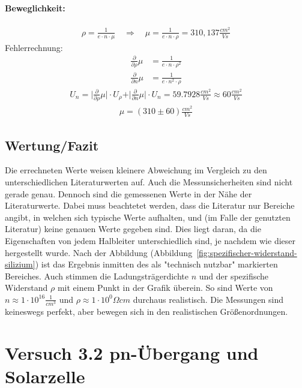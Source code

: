 \documentclass[a4paper]{scrartcl}
\numberwithin{equation}{subsection}
\begin{document}
\paragraph{Beweglichkeit:\\}
\begin{align}
\rho = \frac{1}{e \cdot n \cdot \mu} \quad \Rightarrow \quad \mu = \frac{1}{e \cdot n \cdot \rho} = 310,137 \frac{cm^2}{Vs}
\end{align}
Fehlerrechnung:
\begin{align*}
\frac{\partial}{\partial \rho} \mu &= \frac{1}{e \cdot n \cdot \rho^2} \\
\frac{\partial}{\partial n} \mu &= \frac{1}{e \cdot n^2 \cdot \rho} 
\end{align*}
\begin{align*}
U_{n} = \vert \frac{\partial}{\partial \rho} \mu \vert \cdot U_{\rho} + 
		\vert \frac{\partial}{\partial n} \mu \vert \cdot U_{n} = 59.7928 \frac{cm^2}{Vs} \approx 60 \frac{cm^2}{Vs}
\end{align*}
\begin{align*}
\mu = (310 \pm 60)\frac{cm^2}{Vs}
\end{align*}

\newpage

\subsection{Wertung/Fazit}
Die errechneten Werte weisen kleinere Abweichung im Vergleich zu den unterschiedlichen Literaturwerten auf. Auch die Messunsicherheiten sind nicht gerade genau. Dennoch sind die gemessenen Werte in der Nähe der Literaturwerte. Dabei muss beachtetet werden, dass die Literatur nur Bereiche angibt, in welchen sich typische Werte aufhalten, und (im Falle der genutzten Literatur) keine genauen Werte gegeben sind. Dies liegt daran, da die Eigenschaften von jedem Halbleiter unterschiedlich sind, je nachdem wie dieser hergestellt wurde.
Nach der Abbildung (Abbildung~\ref{fig:spezifischer-widerstand-silizium}) ist das Ergebnis inmitten des als "technisch nutzbar" markierten Bereiches. Auch stimmen die Ladungsträgerdichte $n$ und der spezifische Widerstand $\rho$ mit einem Punkt in der Grafik überein. So sind Werte von $n \approx 1 \cdot 10^{16} \frac{1}{cm^3}$ und $\rho \approx 1 \cdot 10^0 \Omega cm$ durchaus realistisch.
Die Messungen sind keineswegs perfekt, aber bewegen sich in den realistischen Größenordnungen.

\newpage


\section{Versuch 3.2 pn-Übergang und Solarzelle}
\end{document}
